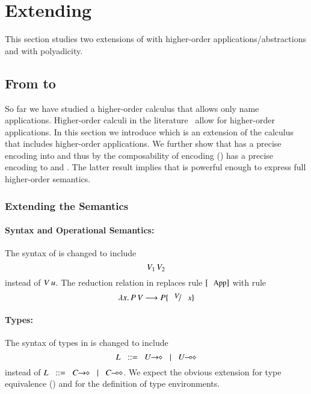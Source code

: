 \section{Extending \HOp}
\label{sec:extension}

This section studies two extensions of \HOp 
with higher-order applications/abstractions 
and 
with polyadicity.

\subsection{From \HOpp to \HOp}

So far we have studied a higher-order calculus that allows
only name applications. Higher-order calculi in the
literature~\cite{} allow for higher-order applications.
In this section we introduce \HOpp which is an 
extension of the \HOp calculus that includes
higher-order applications.
We further show that \HOpp has a precise encoding
into \HOp and thus by the composability of
encoding ()
\HOpp has a precise encoding to \HO and \sessp.
The latter result implies that \HO is powerful
enough to express full higher-order semantics.

\subsubsection{Extending the Semantics}

\paragraph{Syntax and Operational Semantics:}
The syntax of  is changed to
include $$V_1\,V_2$$ instead of $V\,u$.
The reduction relation in 
replaces rule $\orule{App}$ 
with rule $$\appl{\abs{x}{P}}{V} \red P \subst{V}{x}$$

\paragraph{Types:}
The syntax of types in 
is changed to include $$L \bnfis \shot{U} \bnfbar \lhot{U}$$
instead of $L \bnfis \shot{C} \bnfbar \lhot{C}$.
We expect the obvious extension for type equivalence
()
and for the definition of type environments.

